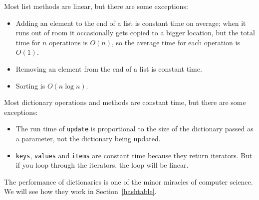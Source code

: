 \documentclass[10pt]{book}
\begin{document}
Most list methods are linear, but there are some exceptions:

\begin{itemize}

\item Adding an element to the end of a list is constant time on
average; when it runs out of room it occasionally gets copied
to a bigger location, but the total time for $n$ operations
is $O(n)$, so the average time for each
operation is $O(1)$.

\item Removing an element from the end of a list is constant time.

\item Sorting is $O(n \log n)$.

\end{itemize}

Most dictionary operations and methods are constant time, but
there are some exceptions:

\begin{itemize}

\item The run time of {\tt update} is
  proportional to the size of the dictionary passed as a parameter,
  not the dictionary being updated.

\item {\tt keys}, {\tt values} and {\tt items} are constant time because
  they return iterators.  But
  if you loop through the iterators, the loop will be linear.

\end{itemize}

The performance of dictionaries is one of the minor miracles of
computer science.  We will see how they work in
Section~\ref{hashtable}.
\end{document}
